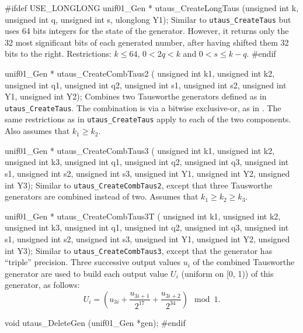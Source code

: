#ifdef USE_LONGLONG
   unif01_Gen * utaus_CreateLongTaus (unsigned int k, unsigned int q,
                                      unsigned int s, ulonglong Y1);
\endcode
  \tab    Similar to {\tt utaus\_CreateTaus} but uses
   64 bits integers for the state of the generator. However, it returns
   only the 32 most significant bits of each  generated number, after
   having shifted them 32 bits to the right. 
   Restrictions: $k \le 64$, $0 < 2q < k$ and $0 < s \le k-q$.
  \endtab
\code
#endif


unif01_Gen * utaus_CreateCombTaus2 (
   unsigned int k1, unsigned int k2, unsigned int q1, unsigned int q2,
   unsigned int s1, unsigned int s2, unsigned int Y1, unsigned int Y2);
\endcode
  \tab  Combines two Tausworthe generators defined as in 
   {\tt utaus\_CreateTaus}. The combination is via a bitwise exclusive-or,
   as in \cite{rLEC96a,rTEZ89a,rTEZ91b}.
   The same restrictions as in  {\tt utaus\_CreateTaus} apply to each of the
   two components.
   Also assumes that $k_1\ge k_2$.
  \endtab
\code


unif01_Gen * utaus_CreateCombTaus3 (
    unsigned int k1, unsigned int k2, unsigned int k3,
    unsigned int q1, unsigned int q2, unsigned int q3,
    unsigned int s1, unsigned int s2, unsigned int s3,
    unsigned int Y1, unsigned int Y2, unsigned int Y3);
\endcode
  \tab  Similar to {\tt utaus\_CreateCombTaus2}, except that 
   three Tausworthe generators are combined instead of two.
   Assumes that  $k_1 \ge k_2 \ge k_3$.
  \endtab
\code


unif01_Gen * utaus_CreateCombTaus3T (
    unsigned int k1, unsigned int k2, unsigned int k3,
    unsigned int q1, unsigned int q2, unsigned int q3,
    unsigned int s1, unsigned int s2, unsigned int s3,
    unsigned int Y1, unsigned int Y2, unsigned int Y3);
\endcode
  \tab  Similar to  {\tt utaus\_CreateCombTaus3}, except that the
   generator has ``triple'' precision.   Three successive output values 
   $u_i$ of the combined Tausworthe generator are used to build each 
   output value $U_i$ (uniform on [0, 1)) of this generator, as follows:
  $$
   U_{i} = \left(u_{3i} + \frac{u_{3i+1}}{2^{17}}  + 
           \frac{u_{3i+2}}{2^{34}}\right) \mod 1.
  $$
  \endtab



\code

void utaus_DeleteGen (unif01_Gen *gen);
\endcode
 \tab \DelGen
 \endtab
\code
\hide
#endif
\endhide
\endcode




